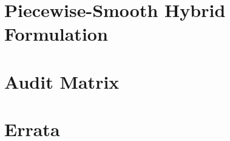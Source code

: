 \documentclass[11pt,a4paper]{article}
\begin{document}
\section{Piecewise-Smooth Hybrid Formulation}


\appendix
\section{Audit Matrix}


\section{Errata}



\end{document}
